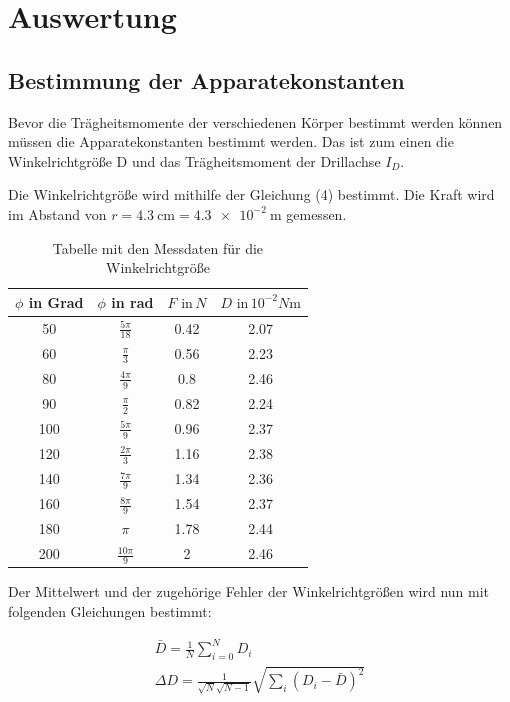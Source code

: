 \section{Auswertung}
\subsection{Bestimmung der Apparatekonstanten}

Bevor die Trägheitsmomente der verschiedenen Körper bestimmt werden können müssen die
Apparatekonstanten bestimmt werden. Das ist zum einen die Winkelrichtgröße D und
das Trägheitsmoment der Drillachse $I_D$.

Die Winkelrichtgröße wird mithilfe der Gleichung (4) bestimmt. Die Kraft wird im Abstand
von $r = \SI{4.3}{\centi\meter} = \SI{4.3e-2}{\meter}$ gemessen.


\begin{table}
  \centering
  \caption{Tabelle mit den Messdaten für die Winkelrichtgröße}
  \begin{tabular}{c c c c}
    \toprule
    $\phi$ in Grad & $\phi$ in rad & $F \, \, \text{in} \, N$ &
    $D \, \, \text{in} \, 10^{-2} N \si{\meter}$ \\
    \midrule
    50 &  $\frac{5\pi}{18}$ & 0.42 & 2.07 \\
    60 &  $\frac{\pi}{3}$ & 0.56 & 2.23 \\
    80 &  $\frac{4\pi}{9}$ & 0.8 & 2.46 \\
    90 &  $\frac{\pi}{2} $ & 0.82 & 2.24 \\
    100 & $\frac{5\pi}{9}$ & 0.96 & 2.37 \\
    120 & $\frac{2\pi}{3}$ & 1.16 & 2.38 \\
    140 & $\frac{7\pi}{9}$ & 1.34 & 2.36 \\
    160 & $\frac{8\pi}{9}$ & 1.54 & 2.37 \\
    180 & $\pi           $ & 1.78 & 2.44 \\
    200 & $\frac{10\pi}{9}$ &   2 & 2.46 \\
    \bottomrule
  \end{tabular}
\end{table}

Der Mittelwert und der zugehörige Fehler der Winkelrichtgrößen wird nun mit
folgenden Gleichungen bestimmt:

\begin{gather}
  \bar{D} = \frac{1}{N} \sum_{i=0}^{N} D_i \\
  \Delta D = \frac{1}{\sqrt{N}\sqrt{N-1}} \sqrt{\sum_{i}(D_i-\bar{D})^2}
\end{gather}

